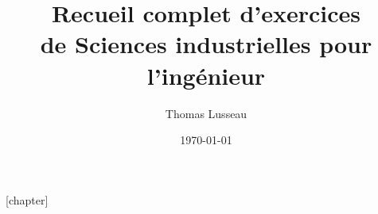 \documentclass[11pt,a4paper,openany]{book}
\title{Recueil complet d'exercices\\de Sciences industrielles pour l'ingénieur}
\author{Thomas Lusseau}
\date{\today}
\begin{document}
\frontmatter
\maketitle
\tableofcontents
\mainmatter
\newcommand{\repExo}{ALL_EXOS}
\newcommand{\nomExo}{ALL_EXOS}
\ifnum{}\relax
  \proftrue
\else
  \proffalse
\fi
\livrettrue
\collefalse
\normaltrue
\setcounter{cptApplication}{1}
\setcounter{cptTD}{1}

\providecommand{\td}{}
\providecommand{\exer}[1]{}
\makeatletter
{}
\makeatother
{}[chapter]
\renewcommand{\theexerciseentry}{\thechapter.\arabic{exerciseentry}}
\providecommand{\theHquestion}{}
\renewcommand{\theHquestion}{\theHchapter.\arabic{exerciseentry}.\arabic{question}}

\newcommand{\ExerciseTitle}[1]{%
  \par\medskip
  \begin{tcolorbox}[
    enhanced,
    breakable,
    colback=SIlightblue,
    colframe=SIblue,
    boxrule=.8pt,
    arc=1.5mm,
    left=3mm,
    right=3mm,
    top=2mm,
    bottom=2mm
  ]
    {\large\bfseries\color{SIblue}Exercice \theexerciseentry}\par\smallskip
    {\bfseries #1}
  \end{tcolorbox}%
}

\renewcommand{\exer}[1]{\ExerciseTitle{#1}}

\providecommand{\n}{\par}
\providecommand{\nsetcounter}{\par\setcounter}
\providecommand{\nRessources}{\par Ressources}

\providecommand{\xpComp}[2]{}
\renewcommand{\xpComp}[2]{\textbf{#1--#2}}

\providecommand{\degres}{}
\renewcommand{\degres}{\ensuremath{^{\circ}}}
\end{document}
